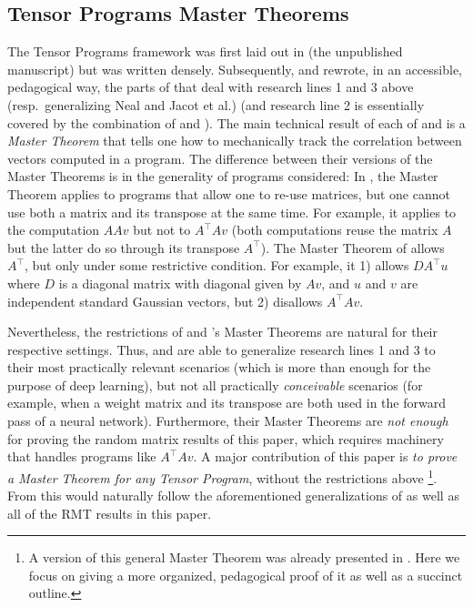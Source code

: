 \documentclass{article}
\theoremstyle{definition}
\theoremstyle{remark}
\newcommand{\trsp}{\top}
\begin{document}
\subsection{Tensor Programs Master Theorems}
\label{sec:IntroTPMasterThm}
The Tensor Programs framework was first laid out in (the unpublished manuscript) \citet{yangScalingLimitsWide2019arXiv.org} but was written densely. Subsequently, \citep{yangTP1} and \citep{yangTP2} rewrote, in an accessible, pedagogical way, the parts of \citet{yangScalingLimitsWide2019arXiv.org} that deal with research lines 1 and 3 above (resp.\ generalizing Neal and Jacot et al.) (and research line 2 is essentially covered by the combination of \citep{yangTP1} and \citep{yangTP2}). The main technical result of each of \citep{yangTP1} and \citep{yangTP2} is a \emph{Master Theorem} that tells one how to mechanically track the correlation between vectors computed in a program. The difference between their versions of the Master Theorems is in the generality of programs considered: In \citep{yangTP1}, the Master Theorem applies to programs that allow one to re-use matrices, but one cannot use both a matrix and its transpose at the same time. For example, it applies to the computation $AAv$ but not to $A^{\trsp}Av$ (both computations reuse the matrix $A$ but the latter do so through its transpose $A^{\trsp}$). The Master Theorem of \citep{yangTP2} allows $A^{\trsp}$, but only under some restrictive condition. For example, it 
1) allows $DA^{\trsp}u$ where $D$ is a diagonal matrix with diagonal given by $Av$, and $u$ and $v$ are independent standard Gaussian vectors, but
2) disallows $A^{\trsp}Av$.

Nevertheless, the restrictions of \citep{yangTP1} and \citep{yangTP2}'s Master Theorems are natural for their respective settings. Thus, \citep{yangTP1} and \citep{yangTP2} are able to generalize research lines 1 and 3 to their most practically relevant scenarios (which is more than enough for the purpose of deep learning), but not all practically \emph{conceivable} scenarios (for example, when a weight matrix and its transpose are both used in the forward pass of a neural network). Furthermore, their Master Theorems are \emph{not enough} for proving the random matrix results of this paper, which requires machinery that handles programs like $A^{\trsp}Av$.
A major contribution of this paper is \emph{to prove a Master Theorem for any Tensor Program}, without the restrictions above%
\footnote{A version of this general Master Theorem was already presented in \citet{yangScalingLimitsWide2019arXiv.org}. Here we focus on giving a more organized, pedagogical proof of it as well as a succinct outline.}.
From this would naturally follow the aforementioned generalizations of \citep{yangTP1,yangTP2} as well as all of the RMT results in this paper.
\end{document}
